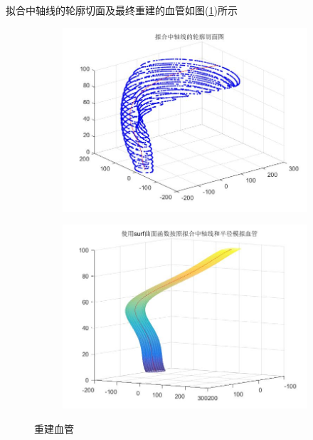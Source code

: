             拟合中轴线的轮廓切面及最终重建的血管如图(\ref{重建血管})所示
           \begin{figure}[H]
                \centering
                \begin{subfigure}[b]{0.4\textwidth}
                    \includegraphics[width=\textwidth]{images/lunkuoqiemian.jpg}
                \end{subfigure}
                \begin{subfigure}[b]{0.4\textwidth}
                    \includegraphics[width=\textwidth]{images/xueguanchongjian.jpg}
                \end{subfigure}
                \caption{重建血管}
                \label{重建血管}
            \end{figure}
% 
